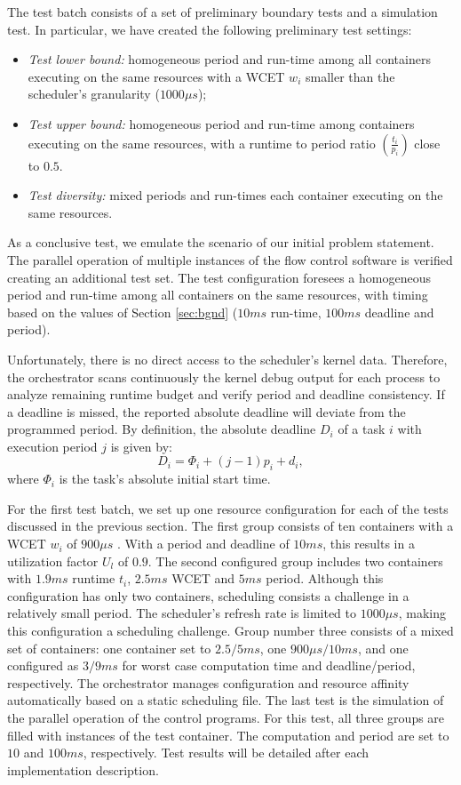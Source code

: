 \documentclass[]{scrartcl}
\begin{document}
The test batch consists of a set of preliminary boundary tests and a simulation test.
In particular, we have created the following preliminary test settings:

\begin{itemize}
	\item \textit{Test lower bound:} homogeneous period and run-time among all containers executing on the same resources with a WCET $w_i$ smaller than the scheduler's granularity ($1000\mu s$);
	\item \textit{Test upper bound:} homogeneous period and run-time among containers executing on the same resources, with a runtime to period ratio $(\frac{t_i}{p_i})$ close to $0.5$.
	\item \textit{Test diversity:} mixed periods and run-times each container executing on the same resources.
\end{itemize}

As a conclusive test, we emulate the scenario of our initial problem statement. 
The parallel operation of multiple instances of the flow control software is verified creating an additional test set.
The test configuration foresees a homogeneous period and run-time among all containers on the same resources, with timing based on the values of Section \ref{sec:bgnd} ($10ms$ run-time, $100ms$ deadline and period).

Unfortunately, there is no direct access to the scheduler's kernel data.
Therefore, the orchestrator scans continuously the kernel debug output for each process to analyze remaining runtime budget and verify period and deadline consistency. 
If a deadline is missed, the reported absolute deadline will deviate from the programmed period. By definition, the absolute deadline $D_i$ of a task $i$ with execution period $j$ is given by:
\begin{equation}
D_i = \Phi_i + (j-1) p_i + d_i,
\end{equation}
where $\Phi_i$ is the task's absolute initial start time.

For the first test batch, we set up one resource configuration for each of the tests discussed in the previous section.
The first group consists of ten containers with a WCET $w_i$ of $900\mu s$ . 
With a period and deadline of $10ms$, this results in a utilization factor $U_l$ of $0.9$.
The second configured group includes two containers with $1.9ms$ runtime $t_i$, $2.5ms$ WCET and $5ms$ period.
Although this configuration has only two containers, scheduling consists a challenge in a relatively small period.
The scheduler's refresh rate is limited to $1000\mu s$, making this configuration a scheduling challenge.
Group number three consists of a mixed set of containers: one container set to $2.5/5ms$, one $900\mu s/10ms$, and one configured as $3/9ms$ for worst case computation time and deadline/period, respectively.
The orchestrator manages configuration and resource affinity automatically based on a static scheduling file.
The last test is the simulation of the parallel operation of the control programs. 
For this test, all three groups are filled with instances of the test container. 
The computation and period are set to $10$ and $100ms$, respectively.
Test results will be detailed after each implementation description.
\end{document}
